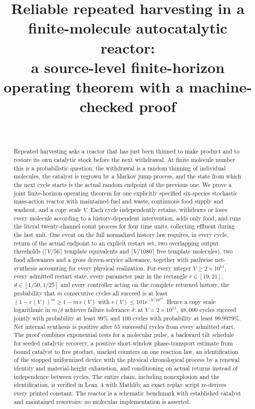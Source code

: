 \documentclass[11pt,a4paper]{article}
\title{Reliable repeated harvesting in a\\ finite-molecule autocatalytic reactor:\\[4pt]
\large a source-level finite-horizon operating theorem with a machine-checked proof}
\author{\PaperAuthor\\ \small \PaperAffiliation}
\date{\PaperDate}
\theoremstyle{plain}
\theoremstyle{definition}
\theoremstyle{remark}
\begin{document}
\maketitle

\begin{abstract}
Repeated harvesting asks a reactor that has just been thinned to make product and to restore its own catalytic stock before the next withdrawal. At finite molecule number this is a probabilistic question: the withdrawal is a random thinning of individual molecules, the catalyst is regrown by a Markov jump process, and the state from which the next cycle starts is the actual random endpoint of the previous one. We prove a joint finite-horizon operating theorem for one explicitly specified six-species stochastic mass-action reactor with maintained fuel and waste, continuous food supply and washout, and a copy scale $V$. Each cycle independently retains, withdraws or loses every molecule according to a history-dependent intervention, adds only food, and runs the literal twenty-channel count process for four time units, collecting effluent during the last unit. One event on the full normalized history law requires, in every cycle, return of the actual endpoint to an explicit restart set, two overlapping output thresholds ($\lceil V/56\rceil$ template equivalents and $\lceil V/1080\rceil$ free template molecules), two food allowances and a gross driven-service allowance, together with pathwise net-synthesis accounting for every physical realization. For every integer $V\ge2\times10^{11}$, every admitted restart state, every parameter pair in the rectangle $r\in[19,21]$, $d\in[1/50,1/25]$ and every controller acting on the complete returned history, the probability that $m$ consecutive cycles all succeed is at least $(1-e(V))^m\ge1-m\,e(V)$ with $e(V)\le101e^{-V/10^{10}}$. Hence a copy scale logarithmic in $m/\delta$ achieves failure tolerance $\delta$: at $V=2\times10^{11}$, $48{,}000$ cycles succeed jointly with probability at least $99\%$ and $100$ cycles with probability at least $99.9979\%$. Net internal synthesis is positive after $55$ successful cycles from every admitted start. The proof combines exponential tests for a molecular pulse, a backward tilt schedule for seeded catalytic recovery, a positive short-window phase-transport estimate from bound catalyst to free product, marked counters on one reaction law, an identification of the stopped uniformized device with the physical chronological process by a renewal identity and material-height exhaustion, and conditioning on actual returns instead of independence between cycles. The entire chain, including nonexplosion and the identification, is verified in Lean~4 with Mathlib; an exact replay script re-derives every printed constant. The reactor is a schematic benchmark with established catalyst and maintained reservoirs; no molecular implementation is asserted.
\end{abstract}
\end{document}
